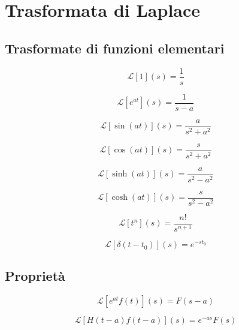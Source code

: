 \documentclass[10pt,a4paper]{article}
\begin{document}
\section{Trasformata di Laplace}


\subsection{Trasformate di funzioni elementari}

\begin{equation}
\mathcal{L}[1](s) = \dfrac{1}{s}
\end{equation}

\begin{equation}
\mathcal{L}[e^{at}](s) = \dfrac{1}{s-a}
\end{equation}

\begin{equation}
\mathcal{L}[\sin (at)](s) = \dfrac{a}{s^{2}+a^{2}}
\end{equation}

\begin{equation}
\mathcal{L}[\cos (at)](s) = \dfrac{s}{s^{2}+a^{2}}
\end{equation}

\begin{equation}
\mathcal{L}[\sinh (at)](s) = \dfrac{a}{s^{2}-a^{2}}
\end{equation}

\begin{equation}
\mathcal{L}[\cosh (at)](s) = \dfrac{s}{s^{2}-a^{2}}
\end{equation}

\begin{equation}
\mathcal{L}[t^{n}](s) = \dfrac{n!}{s^{n+1}}
\end{equation}

\begin{equation}
\mathcal{L}[\delta(t-t_{0})](s) = e^{-st_{0}}
\end{equation}

\subsection{Proprietà}

\begin{equation}
\mathcal{L}[e^{at}f(t)](s) = F(s-a)
\end{equation}

\begin{equation}
\mathcal{L}[H(t-a)f(t-a)](s) = e^{-as}F(s)
\end{equation}
\end{document}
